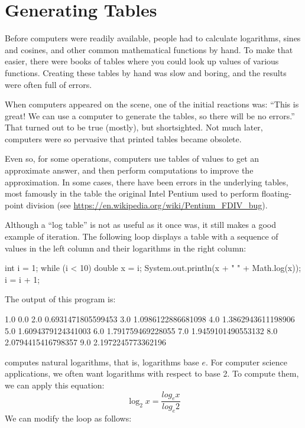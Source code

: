 \section{Generating Tables}


Before computers were readily available, people had to calculate logarithms, sines and cosines, and other common mathematical functions by hand.
To make that easier, there were books of tables where you could look up values of various functions.
Creating these tables by hand was slow and boring, and the results were often full of errors.

When computers appeared on the scene, one of the initial reactions was: ``This is great!
We can use a computer to generate the tables, so there will be no errors.''
That turned out to be true (mostly), but shortsighted.
Not much later, computers were so pervasive that printed tables became obsolete.


Even so, for some operations, computers use tables of values to get an approximate answer, and then perform computations to improve the approximation.
In some cases, there have been errors in the underlying tables, most famously in the table the original Intel Pentium used to perform floating-point division (see \url{https://en.wikipedia.org/wiki/Pentium_FDIV_bug}).

Although a ``log table'' is not as useful as it once was, it still makes a good example of iteration.
The following loop displays a table with a sequence of values in the left column and their logarithms in the right column:

\begin{code}
int i = 1;
while (i < 10) {
    double x = i;
    System.out.println(x + "   " + Math.log(x));
    i = i + 1;
}
\end{code}

The output of this program is:

\begin{stdout}
1.0   0.0
2.0   0.6931471805599453
3.0   1.0986122886681098
4.0   1.3862943611198906
5.0   1.6094379124341003
6.0   1.791759469228055
7.0   1.9459101490553132
8.0   2.0794415416798357
9.0   2.1972245773362196
\end{stdout}

 computes natural logarithms, that is, logarithms base $e$.
For computer science applications, we often want logarithms with respect to base 2.
To compute them, we can apply this equation:
%
\[ \log_2 x = \frac{log_e x}{log_e 2} \]
%
We can modify the loop as follows:

